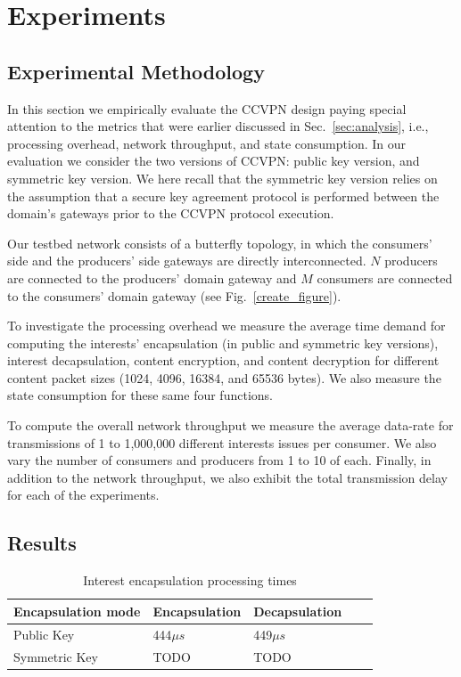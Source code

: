 \section{Experiments}

\subsection{Experimental Methodology}

In this section we empirically evaluate the CCVPN design paying special attention to the metrics that were earlier discussed in Sec.~\ref{sec:analysis}, i.e., processing overhead, network throughput, and state consumption. In our evaluation we consider the two versions of CCVPN: public key version, and symmetric key version. We here recall that the symmetric key version relies on the assumption that a secure key agreement protocol is performed between the domain's gateways prior to the CCVPN protocol execution.

Our testbed network consists of a butterfly topology, in which the consumers' side and the producers' side gateways are directly interconnected. $N$ producers are connected to the producers' domain gateway and $M$ consumers are connected to the consumers' domain gateway (see Fig.~\ref{create_figure}).

To investigate the processing overhead we measure the average time demand for computing the interests' encapsulation (in public and symmetric key versions), interest decapsulation, content encryption, and content decryption for different content packet sizes (1024, 4096, 16384, and 65536 bytes). We also measure the state consumption for these same four functions.

To compute the overall network throughput we measure the average data-rate for transmissions of 1 to 1,000,000 different interests issues per consumer. We also vary the number of consumers and producers from 1 to 10 of each. Finally, in addition to the network throughput, we also exhibit the total transmission delay for each of the experiments.

\subsection{Results}

\begin{table}[!h]
\centering
\caption{Interest encapsulation processing times}
\label{my-label}
\begin{tabular}{|l|l|l|l|l|}
\hline
Encapsulation mode   & Encapsulation & Decapsulation \\ \hline
Public Key  & 444$\mu s$           & 449$\mu s$           \\ \hline \cline{4-5} 
Symmetric Key & TODO          & TODO          \\ \hline
\end{tabular}
\end{table}



